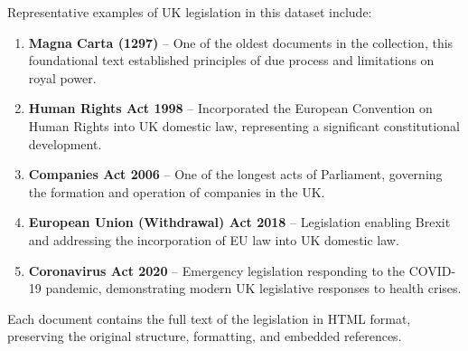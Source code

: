 Representative examples of UK legislation in this dataset include:

\begin{enumerate}
    \item \textbf{Magna Carta (1297)} -- One of the oldest documents in the collection, this foundational text established principles of due process and limitations on royal power.
    
    \item \textbf{Human Rights Act 1998} -- Incorporated the European Convention on Human Rights into UK domestic law, representing a significant constitutional development.
    
    \item \textbf{Companies Act 2006} -- One of the longest acts of Parliament, governing the formation and operation of companies in the UK.
    
    \item \textbf{European Union (Withdrawal) Act 2018} -- Legislation enabling Brexit and addressing the incorporation of EU law into UK domestic law.
    
    \item \textbf{Coronavirus Act 2020} -- Emergency legislation responding to the COVID-19 pandemic, demonstrating modern UK legislative responses to health crises.
\end{enumerate}

Each document contains the full text of the legislation in HTML format, preserving the original structure, formatting, and embedded references.